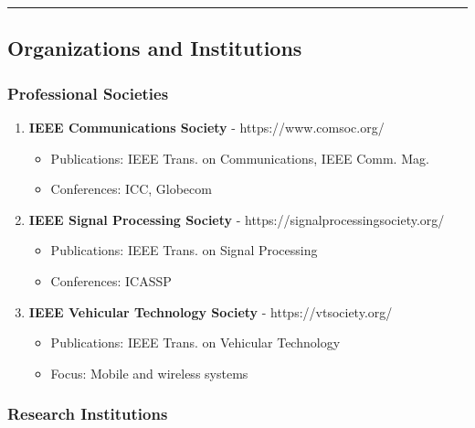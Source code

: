 \begin{center}\rule{0.5\linewidth}{0.5pt}\end{center}

\subsection{\texorpdfstring{ Organizations and
Institutions}{ Organizations and Institutions}}\label{organizations-and-institutions}

\subsubsection{Professional Societies}\label{professional-societies}

\begin{enumerate}
\def\labelenumi{\arabic{enumi}.}
\setcounter{enumi}{56}
\tightlist
\item
  \textbf{IEEE Communications Society} - https://www.comsoc.org/

  \begin{itemize}
  \tightlist
  \item
    Publications: IEEE Trans. on Communications, IEEE Comm. Mag.
  \item
    Conferences: ICC, Globecom
  \end{itemize}
\item
  \textbf{IEEE Signal Processing Society} -
  https://signalprocessingsociety.org/

  \begin{itemize}
  \tightlist
  \item
    Publications: IEEE Trans. on Signal Processing
  \item
    Conferences: ICASSP
  \end{itemize}
\item
  \textbf{IEEE Vehicular Technology Society} - https://vtsociety.org/

  \begin{itemize}
  \tightlist
  \item
    Publications: IEEE Trans. on Vehicular Technology
  \item
    Focus: Mobile and wireless systems
  \end{itemize}
\end{enumerate}

\subsubsection{Research Institutions}\label{research-institutions}


